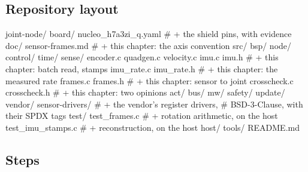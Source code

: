 \subsection*{Repository layout}

\begin{plaincode}
joint-node/
  board/  nucleo_h7a3zi_q.yaml            # + the shield pins, with evidence
  doc/    sensor-frames.md                # + this chapter: the axis convention
  src/
    bsp/  node/  control/  time/
    sense/
      encoder.c quadgen.c velocity.c
      imu.c      imu.h                    # + this chapter: batch read, stamps
      imu_rate.c imu_rate.h               # + this chapter: the measured rate
      frames.c   frames.h                 # + this chapter: sensor to joint
      crosscheck.c crosscheck.h           # + this chapter: two opinions
    act/  bus/  mw/  safety/  update/
  vendor/
    sensor-drivers/                       # + the vendor's register drivers,
                                          #   BSD-3-Clause, with their SPDX tags
  test/
    test_frames.c                         # + rotation arithmetic, on the host
    test_imu_stamps.c                     # + reconstruction, on the host
  host/  tools/  README.md
\end{plaincode}

\subsection*{Steps}

